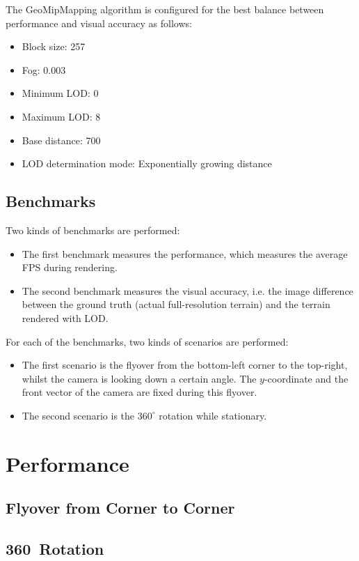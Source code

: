 The GeoMipMapping algorithm is configured for the best balance between 
performance and visual accuracy as follows:
\begin{itemize}
  \item Block size: 257
  \item Fog: 0.003
  \item Minimum LOD: 0
  \item Maximum LOD: 8
  \item Base distance: 700
  \item LOD determination mode: Exponentially growing distance
\end{itemize}

\subsection{Benchmarks}
Two kinds of benchmarks are performed:
\begin{itemize}
  \item The first benchmark measures the performance, which measures the average FPS during rendering.
  \item The second benchmark measures the visual accuracy, i.e. the image difference between the ground truth (actual full-resolution terrain)
        and the terrain rendered with LOD.
\end{itemize}
For each of the benchmarks, two kinds of scenarios are performed:
\begin{itemize}
  \item The first scenario is the flyover from the bottom-left corner to the top-right, whilst the camera is looking down a certain angle.
        The $y$-coordinate and the front vector of the camera are fixed during this flyover.
  \item The second scenario is the $360^{\circ}$ rotation while stationary. 
\end{itemize}

\section{Performance}
\subsection{Flyover from Corner to Corner}
\subsection{360\textdegree~Rotation}

